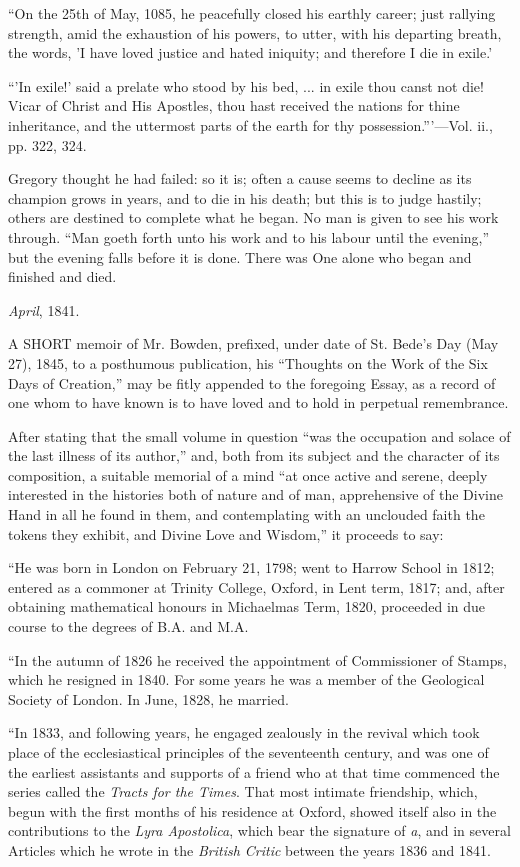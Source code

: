 ``On
the 25th of May, 1085, he peacefully closed his earthly career; just
rallying strength, amid the exhaustion of his powers, to utter, with
his departing breath, the words, 'I have loved justice and hated
iniquity; and therefore I die in exile.'

``'In
exile!' said a prelate who stood by his bed, ... in exile thou canst
not die! Vicar of Christ and His Apostles, thou hast received the
nations for thine inheritance, and the uttermost parts of the earth
for thy possession.'''—Vol. ii., pp. 322, 324.

Gregory thought he had failed: so it is; often a
cause seems to decline as its champion grows in years, and to die in
his death; but this is to judge hastily; others are destined to
complete what he began. No man is given to see his work through. ``Man
goeth forth unto his work and to his labour until the evening,'' but
the evening falls before it is done. There was One alone who began and
finished and died.

\emph{April}, 1841.


A SHORT
memoir of Mr. Bowden, prefixed, under date of St. Bede's Day (May 27),
1845, to a posthumous publication, his ``Thoughts on the Work of
the Six Days of Creation,'' may be fitly appended to the foregoing
Essay, as a record of one whom to have known is to have loved and to
hold in perpetual remembrance.

After stating that the small volume in question ``was
the occupation and solace of the last illness of its author,'' and,
both from its subject and the character of its composition, a suitable
memorial of a mind ``at once active and serene, deeply interested in
the histories both of nature and of man, apprehensive of the Divine
Hand in all he found in them, and contemplating with an unclouded
faith the tokens they exhibit, and Divine Love and Wisdom,'' it
proceeds to say:

``He was born in London on February 21, 1798; went
to Harrow School in 1812; entered as a commoner at Trinity College,
Oxford, in Lent term, 1817; and, after obtaining mathematical honours
in Michaelmas Term, 1820, proceeded in due course to the degrees of
B.A. and M.A.

``In the autumn of 1826 he received the
appointment of Commissioner of Stamps, which he resigned in 1840. For
some years he was a member of the Geological Society of London. In
June, 1828, he married.

``In 1833, and following years, he engaged
zealously in the revival which took place of the ecclesiastical
principles of the seventeenth century, and was one of the earliest assistants and supports of a friend who at that time
commenced the series called the \emph{Tracts for the Times}. That
most intimate friendship, which, begun with the first months of his
residence at Oxford, showed itself also in the contributions to the \emph{Lyra Apostolica}, which
bear the signature of \emph{a}, and in several Articles which he wrote
in the \emph{British Critic} between the years 1836 and 1841.

